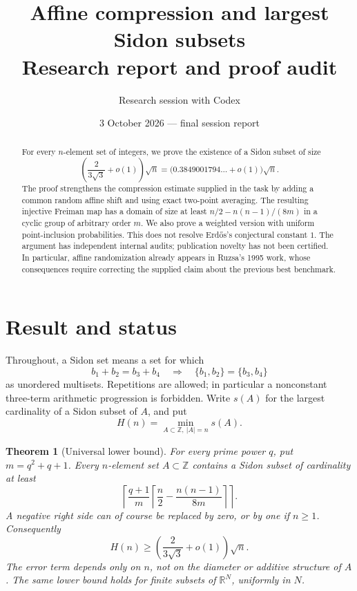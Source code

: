 \documentclass[11pt]{article}
\title{Affine compression and largest Sidon subsets\\\large Research report and proof audit}
\author{Research session with Codex}
\date{3 October 2026 --- final session report}
\newtheorem{theorem}{Theorem}[section]
\theoremstyle{definition}
\theoremstyle{remark}
\newcommand{\Z}{\mathbb Z}
\newcommand{\R}{\mathbb R}
\newcommand{\ceil}[1]{\left\lceil #1\right\rceil}
\begin{document}
\maketitle

\begin{abstract}
For every $n$-element set of integers, we prove the existence of a Sidon
subset of size
\[
\left(\frac{2}{3\sqrt3}+o(1)\right)\sqrt n
=\bigl(0.3849001794\ldots+o(1)\bigr)\sqrt n.
\]
The proof strengthens the compression estimate supplied in the task by
adding a common random affine shift and using exact two-point averaging.
The resulting injective Freiman map has a domain of size at least
$n/2-n(n-1)/(8m)$ in a cyclic group of arbitrary order $m$.
We also prove a weighted version with uniform point-inclusion probabilities.
This does not resolve Erd\H{o}s's conjectural constant $1$.
The argument has independent internal audits; publication novelty has not
been certified. In particular, affine randomization already appears in
Ruzsa's 1995 work, whose consequences require correcting the supplied
claim about the previous best benchmark.
\end{abstract}
\tableofcontents

\section{Result and status}

Throughout, a Sidon set means a set for which
\[
b_1+b_2=b_3+b_4
\quad\Longrightarrow\quad
\{b_1,b_2\}=\{b_3,b_4\}
\]
as unordered multisets. Repetitions are allowed; in particular a
nonconstant three-term arithmetic progression is forbidden. Write $s(A)$
for the largest cardinality of a Sidon subset of $A$, and put
\[
H(n)=\min_{A\subset\Z,\ |A|=n}s(A).
\]

\begin{theorem}[Universal lower bound]\label{thm:main}
For every prime power $q$, put $m=q^2+q+1$. Every $n$-element set
$A\subset\Z$ contains a Sidon subset of cardinality at least
\begin{equation}\label{eq:finite-bound}
\ceil{\frac{q+1}{m}
\ceil{\frac n2-\frac{n(n-1)}{8m}}}.
\end{equation}
A negative right side can of course be replaced by zero, or by one if
$n\ge1$. Consequently
\begin{equation}\label{eq:main}
H(n)\ge\left(\frac{2}{3\sqrt3}+o(1)\right)\sqrt n.
\end{equation}
The error term depends only on $n$, not on the diameter or additive
structure of $A$. The same lower bound holds for finite subsets of
$\R^N$, uniformly in $N$.
\end{theorem}
\end{document}
